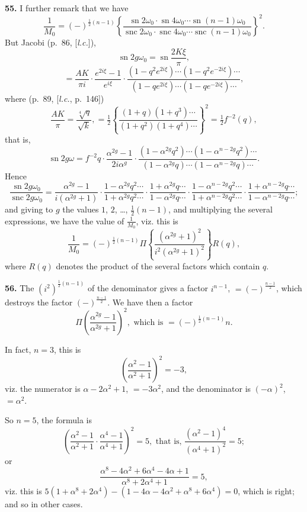 \documentclass[12pt,a4paper]{article}
\DeclareMathOperator{\sn}{sn}
\DeclareMathOperator{\snc}{snc}
\begin{document}
\textbf{55.} I further remark that we have
\[
\frac{1}{M_0} = (-)^{\frac{1}{2}(n-1)}
\left\{\frac{\sn 2\omega_0 \cdot \sn 4\omega_0 \cdots \sn (n-1)\omega_0}
{\snc 2\omega_0 \cdot \snc 4\omega_0 \cdots \snc (n-1)\omega_0}\right\}^2.
\]
But Jacobi (p.~86, [\textit{l.c.}]),
\[
\sn 2g\omega_0 = \sn \frac{2K\xi}{\pi},
\]
\[
= \frac{AK}{\pi i} \cdot \frac{e^{2i\xi} - 1}{e^{i\xi}} \cdot
\frac{(1 - q^2 e^{2i\xi}) \cdots (1 - q^2 e^{-2i\xi}) \cdots}
{(1 - qe^{2i\xi}) \cdots (1 - qe^{-2i\xi}) \cdots},
\]
where (p.~89, [\textit{l.c.}, p.~146])
\[
\frac{AK}{\pi} = \frac{\sqrt[4]{q}}{\sqrt{k}},
= \tfrac{1}{2}\left\{\frac{(1 + q)(1 + q^3) \cdots}{(1 + q^2)(1 + q^4) \cdots}\right\}^2
= \tfrac{1}{2}f^{-2}(q),
\]
that is,
\[
\sn 2g\omega = f^{-2}q \cdot \frac{\alpha^{2g} - 1}{2i\alpha^g} \cdot
\frac{(1 - \alpha^{2g}q^2) \cdots (1 - \alpha^{n-2g}q^2) \cdots}
{(1 - \alpha^{2g}q) \cdots (1 - \alpha^{n-2g}q) \cdots}.
\]
Hence
\[
\frac{\sn 2g\omega_0}{\snc 2g\omega_0}
= \frac{\alpha^{2g} - 1}{i(\alpha^{2g} + 1)} \cdot
\frac{1 - \alpha^{2g}q^2 \cdots}{1 + \alpha^{2g}q^2 \cdots} \cdot
\frac{1 + \alpha^{2g}q \cdots}{1 - \alpha^{2g}q \cdots} \cdot
\frac{1 - \alpha^{n-2g}q^2 \cdots}{1 + \alpha^{n-2g}q^2 \cdots} \cdot
\frac{1 + \alpha^{n-2g}q \cdots}{1 - \alpha^{n-2g}q \cdots};
\]
and giving to $g$ the values $1$, $2$, \ldots, $\frac{1}{2}(n-1)$, and multiplying the several expressions, we have the value of $\frac{1}{M_0}$, viz. this is
\[
\frac{1}{M_0} = (-)^{\frac{1}{2}(n-1)}
\Pi \left\{\frac{(\alpha^{2g} + 1)^2}{i^2(\alpha^{2g} + 1)^2}\right\} R(q),
\]
where $R(q)$ denotes the product of the several factors which contain $q$.

\textbf{56.} The $(i^2)^{\frac{1}{2}(n-1)}$ of the denominator gives a factor $i^{n-1}$, $= (-)^{\frac{n-1}{2}}$, which destroys the factor $(-)^{\frac{n-1}{2}}$. We have then a factor
\[
\Pi \left(\frac{\alpha^{2g} - 1}{\alpha^{2g} + 1}\right)^2, \text{ which is } = (-)^{\frac{1}{2}(n-1)} n.
\]

In fact, $n = 3$, this is
\[
\left(\frac{\alpha^2 - 1}{\alpha^2 + 1}\right)^2 = -3,
\]
viz. the numerator is $\alpha - 2\alpha^2 + 1$, $= -3\alpha^2$, and the denominator is $(-\alpha)^2$, $= \alpha^2$.

So $n = 5$, the formula is
\[
\left(\frac{\alpha^2 - 1}{\alpha^2 + 1} \cdot \frac{\alpha^4 - 1}{\alpha^4 + 1}\right)^2 = 5,
\text{ that is, } \frac{(\alpha^2 - 1)^4}{(\alpha^4 + 1)^2} = 5;
\]
or
\[
\frac{\alpha^8 - 4\alpha^2 + 6\alpha^4 - 4\alpha + 1}{\alpha^8 + 2\alpha^4 + 1} = 5,
\]
viz. this is $5(1 + \alpha^8 + 2\alpha^4) - (1 - 4\alpha - 4\alpha^2 + \alpha^8 + 6\alpha^4) = 0$, which is right; and so in other cases.
\end{document}
